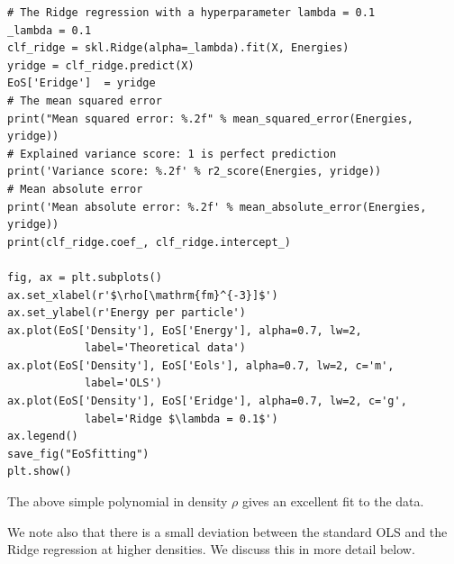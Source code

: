 \documentclass{beamer}
\begin{document}
\begin{frame}
\begin{verbatim}
# The Ridge regression with a hyperparameter lambda = 0.1
_lambda = 0.1
clf_ridge = skl.Ridge(alpha=_lambda).fit(X, Energies)
yridge = clf_ridge.predict(X)
EoS['Eridge']  = yridge
# The mean squared error                               
print("Mean squared error: %.2f" % mean_squared_error(Energies, yridge))
# Explained variance score: 1 is perfect prediction                                 
print('Variance score: %.2f' % r2_score(Energies, yridge))
# Mean absolute error                                                           
print('Mean absolute error: %.2f' % mean_absolute_error(Energies, yridge))
print(clf_ridge.coef_, clf_ridge.intercept_)

fig, ax = plt.subplots()
ax.set_xlabel(r'$\rho[\mathrm{fm}^{-3}]$')
ax.set_ylabel(r'Energy per particle')
ax.plot(EoS['Density'], EoS['Energy'], alpha=0.7, lw=2,
            label='Theoretical data')
ax.plot(EoS['Density'], EoS['Eols'], alpha=0.7, lw=2, c='m',
            label='OLS')
ax.plot(EoS['Density'], EoS['Eridge'], alpha=0.7, lw=2, c='g',
            label='Ridge $\lambda = 0.1$')
ax.legend()
save_fig("EoSfitting")
plt.show()

\end{verbatim}


The above simple polynomial in density $\rho$ gives an excellent fit
to the data. 

We note also that there is a small deviation between the
standard OLS and the Ridge regression at higher densities. We discuss this in more detail
below.
\end{frame}
\end{document}

